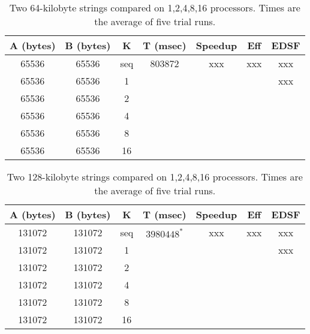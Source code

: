\begin{table}[h]
	\begin{center}
		\begin{tabular}{ | c | c | c | c | c | c | c |}
			\hline 
			A (bytes)&	B (bytes) &	K	&	T (msec)	&	Speedup	&	Eff	&	EDSF \\
			\hline		
			65536   &	65536   &	seq	&	803872		&	xxx		&	xxx	&	xxx \\
			65536  	&	65536  	&	1	&	 	 		&			&		&	xxx \\
			65536  	&	65536  	&	2	&	 	 	 	&			&		&\\
			65536  	&	65536  	&	4	&	 	 	 	&			&		&\\
			65536  	&	65536  	&	8	&	 	 	 	&			&		&\\
			65536  	&	65536  	&	16	&	 	 	 	&			&		&\\
			\hline
		\end{tabular}
	\end{center}
	\caption{Two 64-kilobyte strings compared on {1,2,4,8,16} processors. Times are the average of five trial runs.}
\end{table}


\begin{table}[h]
	\begin{center}
		\begin{tabular}{ | c | c | c | c | c | c | c |}
			\hline 
			A (bytes)	&	B (bytes)		 &	K		&	T (msec)	&	Speedup	&	Eff	&	EDSF \\
			\hline		
			131072   	&	131072  	 	&	seq		&	$3980448^*$	&	xxx		&	xxx	&	xxx \\
			131072  	&	131072  		&	1		&	 	 		&			&		&	xxx \\
			131072  	&	131072  		&	2		&	 	 	 	&			&		&\\
			131072  	&	131072  		&	4		&	 	 	 	&			&		&\\
			131072  	&	131072  		&	8		&	 	 	 	&			&		&\\
			131072  	&	131072  		&	16		&	 	 	 	&			&		&\\
			\hline
		\end{tabular}
	\end{center}
	\caption{Two 128-kilobyte strings compared on {1,2,4,8,16} processors. Times are the average of five trial runs.}
	\label{table:128kb}
\end{table}
